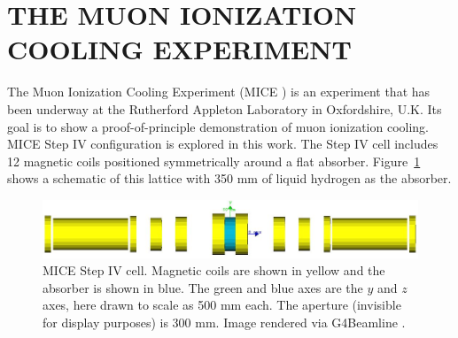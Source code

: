 \documentclass[a4paper,11pt]{article}
\begin{document}

\section{THE MUON IONIZATION COOLING EXPERIMENT}
The Muon Ionization Cooling Experiment (MICE \cite{mice}) is an experiment that has been underway at the Rutherford Appleton Laboratory in Oxfordshire, U.K. Its goal is to show a proof-of-principle demonstration of muon ionization cooling. MICE Step IV configuration is explored in this work. The Step IV cell includes 12 magnetic coils positioned symmetrically around a flat absorber. Figure~\ref{fig:miceStepIV} shows a schematic of this lattice with 350 mm of liquid hydrogen as the absorber.
\begin{figure}[H]
  \centering
    \includegraphics[width=\columnwidth]{miceStepIV} 
  \caption[MICE Step IV cell.]{MICE Step IV cell. Magnetic coils are shown in yellow and the absorber is shown in blue. The green and blue axes are the $y$ and $z$ axes, here drawn to scale as 500 mm each. The aperture (invisible for display purposes) is 300 mm. Image rendered via G4Beamline \cite{G4BL}.}
  \label{fig:miceStepIV}
\end{figure}
\end{document}
